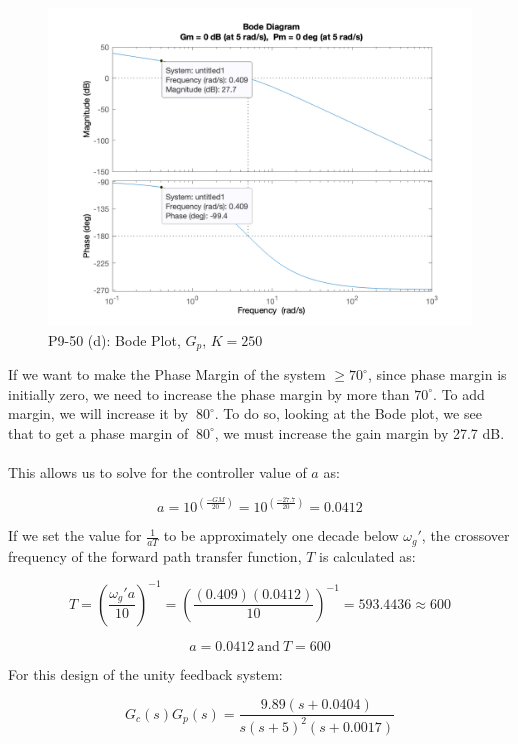 \documentclass[12pt, letterpaper]{../assignment}
\begin{document}
\begin{figure}[H]
    \centering
    \includegraphics[width=1\linewidth]{./figures/bode_prime_9_50d.png}
    \caption{P9-50 (d): Bode Plot, $G_p$, $K = 250$}
\end{figure}

If we want to make the Phase Margin of the system $\ge 70^\circ$,
since phase margin is initially zero, we need to increase the phase margin by more than $70^\circ$.
To add margin, we will increase it by $~80^\circ$.
To do so, looking at the Bode plot, we see that to get a phase margin of $~80^\circ$,
we must increase the gain margin by 27.7 dB.
\\\\
This allows us to solve for the controller value of $a$ as:

$$ a = 10^{\left( \frac{-GM}{20} \right)} = 10^{\left( \frac{-27.7}{20} \right)} = 0.0412 $$

If we set the value for $\frac{1}{aT}$ to be approximately one decade below $\omega_g'$,
the crossover frequency of the forward path transfer function,
$T$ is calculated as:

$$ T = \left(\frac{\omega_g' a}{10}\right)^{-1}
     = \left(\frac{(0.409)(0.0412)}{10}\right)^{-1}
     = 593.4436 \approx 600$$

\begin{answer}
    $$ a = 0.0412  \ \text{and} \ T = 600 $$
\end{answer}

For this design of the unity feedback system:

$$ G_c(s)G_p(s) = \frac{9.89(s + 0.0404)}{s (s +5)^2(s + 0.0017)} $$
\end{document}
